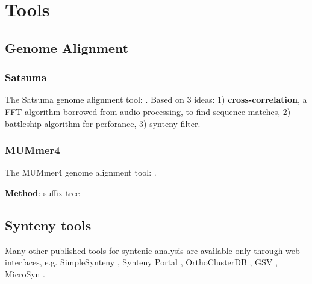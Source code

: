 \section{Tools}

\subsection{Genome Alignment}

\subsubsection{Satsuma}

The Satsuma genome alignment tool: \cite{grabherr2010genome}. Based on 3 ideas:
1) \textbf{cross-correlation}, a FFT algorithm borrowed from audio-processing,
to find sequence matches, 2) battleship algorithm for perforance, 3) synteny
filter.


\subsubsection{MUMmer4}

The MUMmer4 genome alignment tool: \cite{marccais2018mummer4}.

\textbf{Method}: suffix-tree

\subsection{Synteny tools}

Many other published tools for syntenic analysis are available only through web
interfaces, e.g. SimpleSynteny \cite{veltri2016simplesynteny}, Synteny Portal
\cite{lee2016synteny}, OrthoClusterDB \cite{lee2016synteny}, GSV
\cite{revanna2011gsv}, MicroSyn \cite{cai2011microsyn}.

